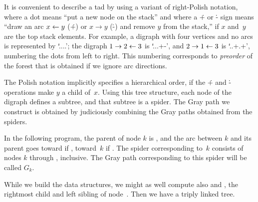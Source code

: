 It is convenient to describe a tad by using a variant
of right-Polish notation, where a dot means ``put a new node on the stack''
and where a \.+ or \.- sign means ``draw an arc $x\gets y$ (\.+) or
$x\to y$ (\.-) and remove $y$ from the stack,'' if $x$ and~$y$ are the
top stack elements. For example, a digraph with four vertices and no arcs is
represented by `\.{....}'; the digraph $1\to2\gets3$ is `\.{...+-}', and
$2\to1\gets 3$ is `\.{..+.+}', numbering the dots from left to right. This
numbering corresponds to {\it preorder\/} of the forest that is obtained if we
ignore arc directions.

The Polish notation implicitly specifies a hierarchical order, if the
\.+ and \.- operations make $y$ a child of~$x$. Using this tree structure,
each node of the digraph defines a subtree, and that subtree is a spider.
The Gray path we
construct is obtained by judiciously combining the Gray paths obtained
from the spiders.

\fi

In the following program, the parent of node $k$ is , and
the
arc between $k$ and its parent goes toward  if ,
toward~$k$ if .
The spider corresponding to~$k$ consists of nodes $k$ through
, inclusive. The Gray path corresponding to this spider
will be called $G_k$.

While we build the data structures, we might as well compute also 
and , the rightmost child and left sibling of node~.
Then we
have a triply linked tree.

